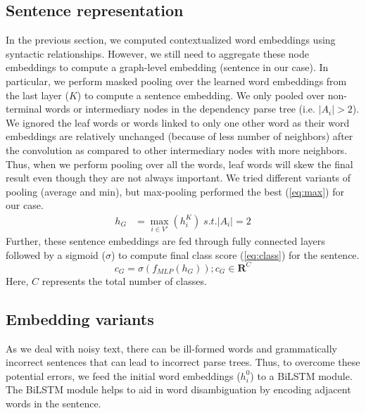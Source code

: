 \subsection{Sentence representation}
In the previous section, we computed contextualized word embeddings using syntactic relationships. However, we still need to aggregate these node embeddings to compute a graph-level embedding (sentence in our case). In particular, we perform masked pooling over the learned word embeddings from the last layer ($K$) to compute a sentence embedding. We only pooled over non-terminal words or intermediary nodes in the dependency parse tree (i.e. $\vert A_{i} \vert > 2$). We ignored the leaf words or words linked to only one other word as their word embeddings are relatively unchanged (because of less number of neighbors) after the convolution as compared to other intermediary nodes with more neighbors. Thus, when we perform pooling over all the words, leaf words will skew the final result even though they are not always important. We tried different variants of pooling (average and min), but max-pooling performed the best (\cref{eq:max}) for our case.
\begin{align}
  \label{eq:max}
    h_G &= \max_{i \in V'} (h_i^K) \; s.t. \vert A_{i} \vert = 2
\end{align}
Further, these sentence embeddings are fed through fully connected layers followed by a sigmoid ($\sigma$) to compute final class score (\cref{eq:class}) for the sentence.
\begin{equation}
    c_G =   \sigma (f_{MLP}(h_G)); c_G \in \mathbf{R}^C
    \label{eq:class}
\end{equation}
Here, $C$ represents the total number of classes.

\subsection{Embedding variants}
As we deal with noisy text, there can be ill-formed words and grammatically incorrect sentences that can lead to incorrect parse trees. Thus, to overcome these potential errors, we feed the initial word embeddings ($h_i^0$) to a BiLSTM module. The BiLSTM module helps to aid in word disambiguation by encoding adjacent words in the sentence.

